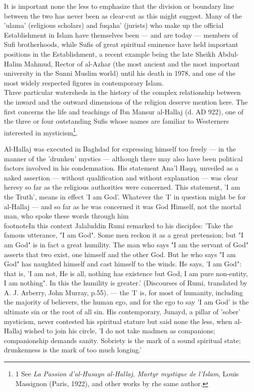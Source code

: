 \documentclass[11pt, b5paper, twoside]{book}
\begin{document}
It is important none the less to emphasize that the division or boundary line between the two has 
never been as clear-cut as this might suggest. Many of the 'ulama' (religious scholars) and fuqaha' 
(jurists) who make up the official Establishment in Islam have themselves been --- and are today --- 
members of Sufi brotherhoods, while Sufis of great spiritual eminence have held important positions 
in the Establishment, a recent example being the late Sheikh Abdul-Halim Mahmud, Rector of al-Azhar 
(the most ancient and the most important university in the Sunni Muslim world) until his death in 
1978, and one of the most widely respected figures in contemporary Islam. \\

Three particular watersheds in the history of the complex relationship between the inward and the 
outward dimensions of the religion deserve mention here. The first concerns the life and teachings of 
Ibn Mansur al-Hallaj (d. AD 922), one of the three or four outstanding Sufis whose names are familiar 
to Westerners interested in mysticism\footnote{1 See \emph{La Passion d'al-Husayn al-Hallaj, Martyr mystique de l'Islam}, Louis Massignon (Paris, 1922), and other works by rhe same author.}.

Al-Hallaj was executed in Baghdad for expressing himself too freely --- in the manner of the 'drunken' 
mystics --- although there may also have been political factors involved in his condemnation. His 
statement Ana'l Haqq, unveiled as a naked assertion --- without qualification and without explanation --- 
was clear heresy so far as the religious authorities were concerned. This statement, 'I am the 
Truth', means in effect 'I am God'. Whatever the 'I' in question might be for al-Hallaj --- and so far 
as he was concerned it was God Himself, not the mortal man, who spoke these words through him\\footnote{In this context Jalaluddin Rumi remarked to his disciples: 'Take the famous utterance, "I am God". 
Some men reckon it as a great pretension; but "I am God" is in fact a great humility. The man who 
says "I am the servant of God" asserts that two exist, one himself and the other God. But he who says 
"I am God" has naughted himself and cast himself to the winds. He says, 'I am God": that is, 'I am 
not, He is all, nothing has existence but God, I am pure non-entity, I am nothing". In this the 
humility is greater.' (Discourses of Rumi, translated by A. J. Arberry, John Murray, p.55).} --- 
the 'I' is, for most of humanity, including the majority of believers, the human ego, and for the ego 
to say 'I am God' is the ultimate sin or the root of all sin. His contemporary, Junayd, a pillar of 
'sober' mysticism, never contested his spiritual stature but said none the less, when al-Hallaj 
wished to join his circle, 'I do not take madmen as companions; companionship demands sanity. 
Sobriety is the mark of a sound spiritual state; drunkenness is the mark of too much longing.' \\
\end{document}
